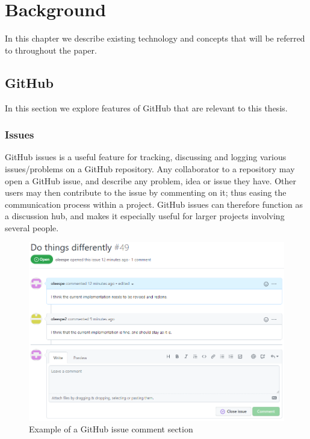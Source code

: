 
\chapter{Background}
\label{ch:background}

In this chapter we describe existing technology and concepts that will be referred to throughout the paper.

\section{GitHub}

In this section we explore features of GitHub that are relevant to this thesis.

\subsection{Issues}

GitHub issues is a useful feature for tracking, discussing and logging various issues/problems on a GitHub repository.
Any collaborator to a repository may open a GitHub issue, and describe any problem, idea or issue they have.
Other users may then contribute to the issue by commenting on it; thus easing the communication process within a project.
GitHub issues can therefore function as a discussion hub, and makes it especially useful for larger projects involving several people. 

\begin{figure}[ht]
    \centering
    \includegraphics[width=\textwidth]{photos/github-issue.PNG}
    \caption{Example of a GitHub issue comment section}
    \label{fig:github-issue}
\end{figure}


